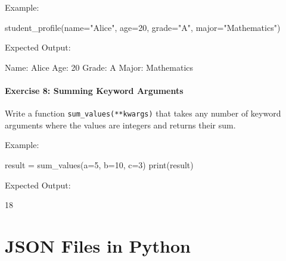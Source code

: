 \documentclass[
  letterpaper,
  DIV=11,
  numbers=noendperiod]{scrreprt}
\newenvironment{Shaded}{\begin{snugshade}}{\end{snugshade}}
\newcommand{\BuiltInTok}[1]{\textcolor[rgb]{0.00,0.23,0.31}{#1}}
\newcommand{\DecValTok}[1]{\textcolor[rgb]{0.68,0.00,0.00}{#1}}
\newcommand{\NormalTok}[1]{\textcolor[rgb]{0.00,0.23,0.31}{#1}}
\newcommand{\OperatorTok}[1]{\textcolor[rgb]{0.37,0.37,0.37}{#1}}
\newcommand{\StringTok}[1]{\textcolor[rgb]{0.13,0.47,0.30}{#1}}
\begin{document}
Example:

\begin{Shaded}
\begin{Highlighting}[]
\NormalTok{student\_profile(name}\OperatorTok{=}\StringTok{"Alice"}\NormalTok{, age}\OperatorTok{=}\DecValTok{20}\NormalTok{, grade}\OperatorTok{=}\StringTok{"A"}\NormalTok{, major}\OperatorTok{=}\StringTok{"Mathematics"}\NormalTok{)}
\end{Highlighting}
\end{Shaded}

Expected Output:

\begin{Shaded}
\begin{Highlighting}[]
\NormalTok{Name: Alice}
\NormalTok{Age: }\DecValTok{20}
\NormalTok{Grade: A}
\NormalTok{Major: Mathematics}
\end{Highlighting}
\end{Shaded}

\hypertarget{exercise-8-summing-keyword-arguments}{%
\subsubsection{Exercise 8: Summing Keyword
Arguments}\label{exercise-8-summing-keyword-arguments}}

Write a function \texttt{sum\_values(**kwargs)} that takes any number of
keyword arguments where the values are integers and returns their sum.

Example:

\begin{Shaded}
\begin{Highlighting}[]
\NormalTok{result }\OperatorTok{=}\NormalTok{ sum\_values(a}\OperatorTok{=}\DecValTok{5}\NormalTok{, b}\OperatorTok{=}\DecValTok{10}\NormalTok{, c}\OperatorTok{=}\DecValTok{3}\NormalTok{)}
\BuiltInTok{print}\NormalTok{(result)}
\end{Highlighting}
\end{Shaded}

Expected Output:

\begin{Shaded}
\begin{Highlighting}[]
\DecValTok{18}
\end{Highlighting}
\end{Shaded}


\hypertarget{sec-json}{%
\chapter{JSON Files in Python}\label{sec-json}}
\end{document}
